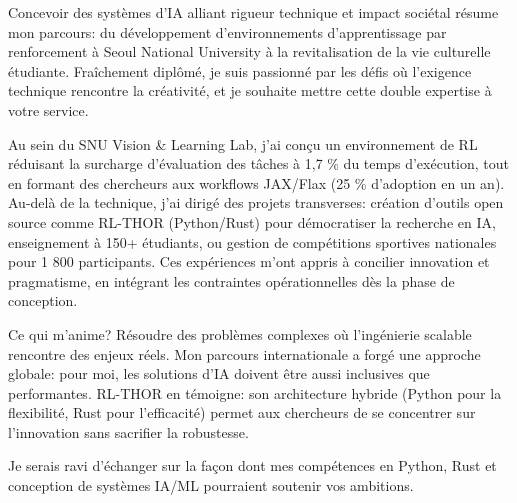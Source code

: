 
\newcommand{\Company}{}
\recipient{\phantom{.}}{}
\date{}
\makelettertitle{}

Concevoir des systèmes d'IA alliant rigueur technique et impact sociétal résume mon parcours: du développement d'environnements d'apprentissage par renforcement à Seoul National University à la revitalisation de la vie culturelle étudiante. Fraîchement diplômé, je suis passionné par les défis où l'exigence technique rencontre la créativité, et je souhaite mettre cette double expertise à votre service.

Au sein du SNU Vision \& Learning Lab, j'ai conçu un environnement de RL réduisant la surcharge d'évaluation des tâches à 1,7 \% du temps d'exécution, tout en formant des chercheurs aux workflows JAX/Flax (25 \% d'adoption en un an). Au-delà de la technique, j'ai dirigé des projets transverses: création d'outils open source comme RL-THOR (Python/Rust) pour démocratiser la recherche en IA, enseignement à 150+ étudiants, ou gestion de compétitions sportives nationales pour 1 800 participants. Ces expériences m'ont appris à concilier innovation et pragmatisme, en intégrant les contraintes opérationnelles dès la phase de conception.

Ce qui m'anime? Résoudre des problèmes complexes où l'ingénierie scalable rencontre des enjeux réels. Mon parcours internationale a forgé une approche globale: pour moi, les solutions d'IA doivent être aussi inclusives que performantes. RL-THOR en témoigne: son architecture hybride (Python pour la flexibilité, Rust pour l'efficacité) permet aux chercheurs de se concentrer sur l'innovation sans sacrifier la robustesse.

Je serais ravi d'échanger sur la façon dont mes compétences en Python, Rust et conception de systèmes IA/ML pourraient soutenir vos ambitions.

\makeletterclosing

